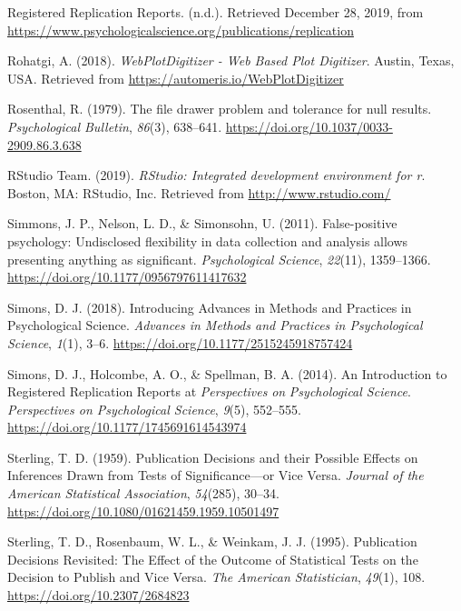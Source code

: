 \documentclass[british,,man,floatsintext]{apa6}
\begin{document}
\leavevmode\hypertarget{ref-RRRwebsite}{}%
Registered Replication Reports. (n.d.). Retrieved December 28, 2019, from \url{https://www.psychologicalscience.org/publications/replication}

\leavevmode\hypertarget{ref-Rohatgi2018}{}%
Rohatgi, A. (2018). \emph{WebPlotDigitizer - Web Based Plot Digitizer}. Austin, Texas, USA. Retrieved from \url{https://automeris.io/WebPlotDigitizer}

\leavevmode\hypertarget{ref-Rosenthal1979}{}%
Rosenthal, R. (1979). The file drawer problem and tolerance for null results. \emph{Psychological Bulletin}, \emph{86}(3), 638--641. \url{https://doi.org/10.1037/0033-2909.86.3.638}

\leavevmode\hypertarget{ref-RStudioTeam2019}{}%
RStudio Team. (2019). \emph{RStudio: Integrated development environment for r}. Boston, MA: RStudio, Inc. Retrieved from \url{http://www.rstudio.com/}

\leavevmode\hypertarget{ref-Simmons2011}{}%
Simmons, J. P., Nelson, L. D., \& Simonsohn, U. (2011). False-positive psychology: Undisclosed flexibility in data collection and analysis allows presenting anything as significant. \emph{Psychological Science}, \emph{22}(11), 1359--1366. \url{https://doi.org/10.1177/0956797611417632}

\leavevmode\hypertarget{ref-Simons2018}{}%
Simons, D. J. (2018). Introducing Advances in Methods and Practices in Psychological Science. \emph{Advances in Methods and Practices in Psychological Science}, \emph{1}(1), 3--6. \url{https://doi.org/10.1177/2515245918757424}

\leavevmode\hypertarget{ref-Simons2014}{}%
Simons, D. J., Holcombe, A. O., \& Spellman, B. A. (2014). An Introduction to Registered Replication Reports at \emph{Perspectives} \emph{on} \emph{Psychological Science}. \emph{Perspectives on Psychological Science}, \emph{9}(5), 552--555. \url{https://doi.org/10.1177/1745691614543974}

\leavevmode\hypertarget{ref-Sterling1959}{}%
Sterling, T. D. (1959). Publication Decisions and their Possible Effects on Inferences Drawn from Tests of Significance---or Vice Versa. \emph{Journal of the American Statistical Association}, \emph{54}(285), 30--34. \url{https://doi.org/10.1080/01621459.1959.10501497}

\leavevmode\hypertarget{ref-Sterling1995}{}%
Sterling, T. D., Rosenbaum, W. L., \& Weinkam, J. J. (1995). Publication Decisions Revisited: The Effect of the Outcome of Statistical Tests on the Decision to Publish and Vice Versa. \emph{The American Statistician}, \emph{49}(1), 108. \url{https://doi.org/10.2307/2684823}
\end{document}
